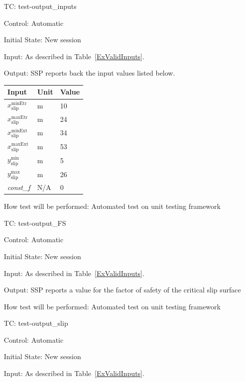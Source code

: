 \documentclass[12pt, titlepage]{article}
\newcounter{testnum} %
\newcommand{\progname}{SSP}
\begin{document}
\begin{enumerate}[label=TC\arabic*:,ref={\arabic*}]
	
\item [TC\refstepcounter{testnum}\thetestnum: \label{TC_OutInputs}] 
test-output\_inputs

Control: Automatic

Initial State: New session

Input: As described in Table~\ref{ExValidInputs}.

Output: \progname{} reports back the input values listed below.\\
\begin{tabularx}{1.0\textwidth}{p{7cm} l X}
		\toprule \textbf{Input} &
		\textbf{Unit} & \textbf{Value}\\ \midrule
		${x_\text{slip}^\text{minEtr}}$ & $\text{m}$ & 10\\
		${x_\text{slip}^\text{maxEtr}}$ & $\text{m}$ & 24\\
		${x_\text{slip}^\text{minExt}}$ & $\text{m}$ & 34\\
		${x_\text{slip}^\text{maxExt}}$ & $\text{m}$ & 53\\
		${y_\text{slip}^\text{min}}$ & $\text{m}$ & 5\\
		${y_\text{slip}^\text{max}}$ & $\text{m}$ & 26\\
		\textit{const\_f} & N/A & 0\\ 
		\bottomrule
\end{tabularx}

How test will be performed: Automated test on unit testing framework

\item [TC\refstepcounter{testnum}\thetestnum: \label{TC_OutFS}] 
test-output\_FS

Control: Automatic

Initial State: New session

Input: As described in Table~\ref{ExValidInputs}.

Output: \progname{} reports a value for the factor of safety of the critical 
slip surface

How test will be performed: Automated test on unit testing framework

\item [TC\refstepcounter{testnum}\thetestnum: \label{TC_OutSlip}] 
test-output\_slip

Control: Automatic

Initial State: New session

Input: As described in Table~\ref{ExValidInputs}.


\end{enumerate}
\end{document}

